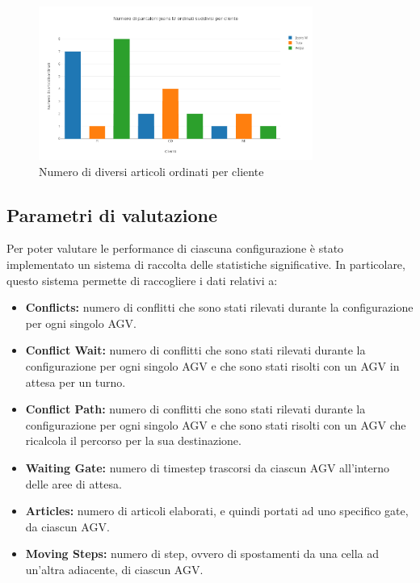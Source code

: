 \documentclass[12pt]{article}
\begin{document}
\begin{figure}[ht]
\centering
\includegraphics[width=0.8\textwidth,keepaspectratio]{Figures/Graphics/articoli_clienti.png}
\caption[Numero di diversi articoli per cliente]{Numero di diversi articoli ordinati per cliente}
\label{fig:Electron}
\end{figure}



\newpage

\subsection{Parametri di valutazione}
Per poter valutare le performance di ciascuna configurazione è stato implementato un sistema di raccolta delle statistiche significative. In particolare, questo sistema permette di raccogliere i dati relativi a:

\begin{itemize}
    \item \textbf{Conflicts:} numero di conflitti che sono stati rilevati durante la configurazione per ogni singolo AGV.
    \item \textbf{Conflict Wait:} numero di conflitti che sono stati rilevati durante la configurazione per ogni singolo AGV e che sono stati risolti con un AGV in attesa per un turno.
    \item \textbf{Conflict Path:} numero di conflitti che sono stati rilevati durante la configurazione per ogni singolo AGV e che sono stati risolti con un AGV che ricalcola il percorso per la sua destinazione.
    \item \textbf{Waiting Gate:} numero di timestep trascorsi da ciascun AGV all'interno delle aree di attesa.
    \item \textbf{Articles:}  numero di articoli elaborati, e quindi portati ad uno specifico gate, da ciascun AGV.
    \item \textbf{Moving Steps:} numero di step, ovvero di spostamenti da una cella ad un'altra adiacente, di ciascun AGV.
\end{itemize}
\end{document}
